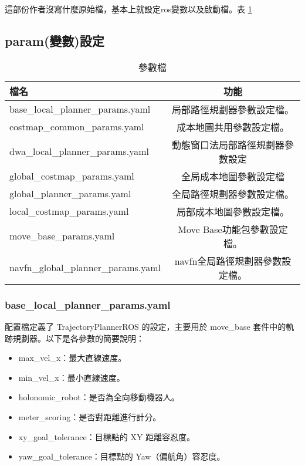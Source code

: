 這部份作者沒寫什麼原始檔，基本上就設定ros變數以及啟動檔。表
\ref{tab:nvparm}

\subsection{param(變數)設定}
\begin{table}[ht]
\centering
\caption{參數檔}
\label{tab:nvparm}
\begin{tabular}{|l|c|}
\hline
\textbf{檔名} & \textbf{功能} \\
\hline
base\_local\_planner\_params.yaml & 局部路徑規劃器參數設定檔。\\
\hline
costmap\_common\_params.yaml & 成本地圖共用參數設定檔。\\
\hline
dwa\_local\_planner\_params.yaml &  動態窗口法局部路徑規劃器參數設定\\
\hline
global\_costmap\_params.yaml & 全局成本地圖參數設定檔\\
\hline
global\_planner\_params.yaml & 全局路徑規劃器參數設定檔。\\
\hline
local\_costmap\_params.yaml & 局部成本地圖參數設定檔。\\
\hline
move\_base\_params.yaml & Move Base功能包參數設定檔。\\
\hline
navfn\_global\_planner\_params.yaml & navfn全局路徑規劃器參數設定檔。\\
\hline
\end{tabular}
\end{table}
\subsubsection{base\_local\_planner\_params.yaml}
配置檔定義了 TrajectoryPlannerROS 的設定，主要用於 move\_base 套件中的軌跡規劃器。以下是各參數的簡要說明：
\begin{itemize}
    \item max\_vel\_x：最大直線速度。
    \item min\_vel\_x：最小直線速度。
    \item holonomic\_robot：是否為全向移動機器人。
    \item meter\_scoring：是否對距離進行計分。
    \item xy\_goal\_tolerance：目標點的 XY 距離容忍度。
    \item yaw\_goal\_tolerance：目標點的 Yaw（偏航角）容忍度。
\end{itemize}
